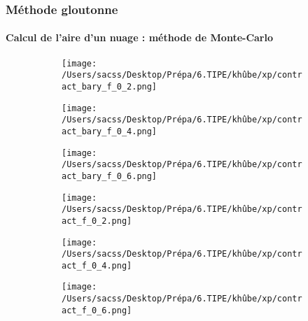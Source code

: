 \documentclass{beamer}
\begin{document}
\begin{frame}
	\frametitle{Méthode gloutonne}
	\framesubtitle{Calcul de l'aire d'un nuage : méthode de Monte-Carlo}
	\begin{figure}[h!]
		\centering 
		\hspace*{\fill}
		\begin{subfigure}{0.25\textwidth}
			\centering 
			\texttt{[image: /Users/sacss/Desktop/Prépa/6.TIPE/khûbe/xp/contract\_bary\_f\_0\_2.png]}
		\end{subfigure}
		\hspace*{\fill}
		\begin{subfigure}{0.25\textwidth}
			\centering 
			\texttt{[image: /Users/sacss/Desktop/Prépa/6.TIPE/khûbe/xp/contract\_bary\_f\_0\_4.png]}
		\end{subfigure}
		\hspace*{\fill}
		\begin{subfigure}{0.25\textwidth}
			\centering 
			\texttt{[image: /Users/sacss/Desktop/Prépa/6.TIPE/khûbe/xp/contract\_bary\_f\_0\_6.png]}
		\end{subfigure}
		\hspace*{\fill}
		
	\end{figure}


	\begin{figure}[h!]
		\centering 
		\hspace*{\fill}
		\begin{subfigure}{0.25\textwidth}
			\centering 
			\texttt{[image: /Users/sacss/Desktop/Prépa/6.TIPE/khûbe/xp/contract\_f\_0\_2.png]}
		\end{subfigure}
		\hspace*{\fill}
		\begin{subfigure}{0.25\textwidth}
			\centering 
			\texttt{[image: /Users/sacss/Desktop/Prépa/6.TIPE/khûbe/xp/contract\_f\_0\_4.png]}
		\end{subfigure}
		\hspace*{\fill}
		\begin{subfigure}{0.25\textwidth}
			\centering 
			\texttt{[image: /Users/sacss/Desktop/Prépa/6.TIPE/khûbe/xp/contract\_f\_0\_6.png]}
		\end{subfigure}
		\hspace*{\fill}
		
	\end{figure}
\end{frame}
\end{document}
